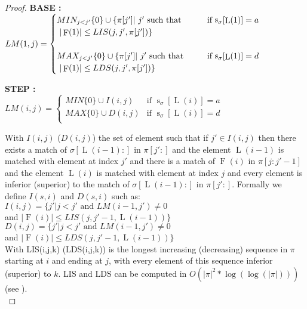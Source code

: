 \documentclass[a4paper]{llncs}
\newcommand{\ptext}{\pi}
\newcommand{\pmotif}{\sigma}
\DeclareMathOperator{\stripea}{s}
\newcommand{\stripe}[2]{\stripea_{{#1}}[{#2}]}
\newcounter{num}
\newcommand{\dstep}{d}
\newcommand{\ustep}{a}
\DeclareMathOperator{\firsta}{L}
\newcommand{\first}[1]{\firsta({#1})}
\DeclareMathOperator{\factora}{F}
\newcommand{\factor}[1]{\factora({#1})}
\begin{document}
\begin{proof}
\textbf{BASE :} \\
$
LM(1,j)=
\begin{cases}
		MIN_{j<j'}\{0\} \cup \{\ptext[j'] |\text{ $j'$ such that \indent } &
			\text{if $\stripe{\pmotif}{\first{1}}=\ustep$} \\
		\text{ $|\factor{1}| \leq LIS(j,j',\ptext[j'])  $}\}& \\
		&\\
		MAX_{j<j'}\{0\} \cup \{\ptext[j'] |\text{ $j'$ such that \indent } &
			\text{if $\stripe{\pmotif}{\first{1}}=\dstep$} \\
		\text{ $|\factor{1}| \leq LDS(j,j',\ptext[j']) $}\}&\\
\end{cases}
$

\textbf{STEP :} \\
$
LM(i,j)=
\begin{cases}
	MIN \{0\} \cup  I(i,j) &
	\text{if $\stripe{\pmotif}{\first{i}}=\ustep$}\\
	MAX \{0\} \cup  D(i,j) &
	\text{if $\stripe{\pmotif}{\first{i}}=\dstep$}\\
\end{cases}
$


With $I(i,j)$ ($D(i,j)$) the set of element such that
if  $j' \in I(i,j)$ then there exists
a match of $\pmotif[\first{i-1}:]$ in $\ptext[j':]$ and
the element $\first{i-1}$ is matched with element at index $j'$ and
there is a match of $\factor{i}$ in $\ptext[j:j'-1]$ and
the element $\first{i}$ is matched with element at index $j$ and every element is inferior (superior) to the match of
$\pmotif[\first{i-1}:]$ in $\ptext[j':]$.
Formally we define $I(s,i)$ and $D(s,i)$ such as:\\

$I(i,j)=\{j'|\text{$j<j'$ and $LM(i-1,j')\neq 0$}$ \\
\indent \indent \indent and  $|\factor{i}| \leq LIS(j,j'-1,\first{i-1})\}$ \\

$D(i,j)=\{j'|\text{$j<j'$ and $LM(i-1,j')\neq 0$}$ \\
\indent \indent \indent and  $|\factor{i}| \leq LDS(j,j'-1,\first{i-1}) \}$ \\

With LIS(i,j,k) (LDS(i,j,k)) is the longest increasing (decreasing) sequence in $\ptext$ starting at $i$ and ending at $j$,
with every element of this sequence
inferior (superior) to $k$.
LIS and LDS can be computed in $O(|\ptext|^2*\log(\log(|\ptext|)))$ (see \cite{Bespamyatnikh00enumeratinglongest}).\\


\end{proof}
\end{document}
